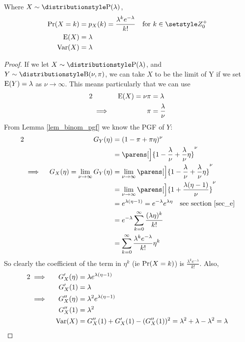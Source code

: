 \begin{theorem}
 Where \(X \sim \Poisson(\lambda)\),
 \begin{align*}
  \Prob(X = k) &= p_X(k) = \frac{\lambda^k e^{-\lambda}}{k!}
      \quad \text{for \(k \in \Integers^+_0\)} \\
  \Expect(X) &= \lambda \\
  \Var(X) &= \lambda
 \end{align*}
\end{theorem}
\begin{proof}
 If we let \(X \sim \Poisson(\lambda)\), and \(Y \sim \Binomial(\nu, \pi)\),
 we can take \(X\) to be the limit of Y if we set \(\operatorname{E}(Y) = \lambda\)
 as \(\nu \to \infty\). This means particularly that we can use
 \begin{alignat*}2
  && \Expect(X) = \nu \pi &= \lambda \\
  &\implies{}& \pi &= \frac \lambda \nu
 \end{alignat*}
 From Lemma \ref{lem_binom_pgf} we know the PGF of \(Y\):
 \begin{alignat*}2
  && G_Y(\eta) &= (1 - \pi + \pi \eta)^\nu \\
  &&  &= \parens[\Big]{1 - \frac \lambda \nu + \frac \lambda \nu \eta}^\nu \\
  &\implies{}& G_X(\eta) = \lim_{\nu \to \infty}G_Y(\eta)
      &= \lim_{\nu \to \infty} \parens[\Big]{1 - \frac \lambda \nu
                                  + \frac \lambda \nu \eta}^\nu \\
  &&  &= \lim_{\nu \to \infty} \parens[\Big]
      {1 + \frac{\lambda(\eta - 1)}\nu}^\nu \\
  &&  &= e^{\lambda(\eta - 1)} = e^{-\lambda}e^{\lambda \eta}
      \quad \text{see section \ref{sec_e}} \\
  &&  &= e^{-\lambda} \sum_{k = 0}^\infty \frac{(\lambda \eta)^k}{k!} \\
  &&  &= \sum_{k = 0}^\infty \frac{\lambda ^k e^{-\lambda}}{k!} \eta^k
 \end{alignat*}
  So clearly the coefficient of the term in \(\eta^k\) (ie \(\operatorname{Pr}(X = k)\))
  is \(\frac{\lambda^k e^{-\lambda}}{k!}\). Also,
  \begin{alignat*}2
  &\implies{}& G_X'(\eta) &= \lambda e^{\lambda(\eta - 1)} \\
  && G_X'(1) &= \lambda \\
  &\implies{}& G_X''(\eta) &= \lambda^2 e^{\lambda(\eta - 1)} \\
  && G_X''(1) &= \lambda^2 \\
  && \Var(X) &= G_X''(1) + G_X'(1) - (G_X''(1))^2
      = \lambda^2 + \lambda - \lambda^2 = \lambda \qedhere
 \end{alignat*}
\end{proof}

